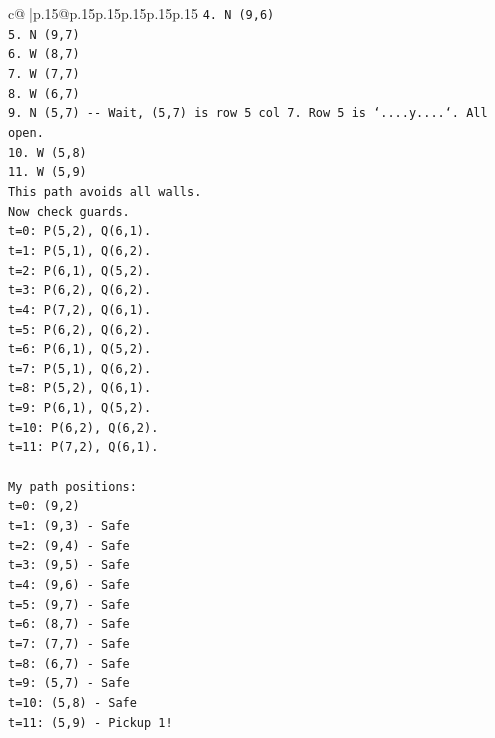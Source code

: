 \documentclass{article}
\begin{document}
{\begin{supertabular}{c@{$\;$}|p{.15\linewidth}@{}p{.15\linewidth}p{.15\linewidth}p{.15\linewidth}p{.15\linewidth}p{.15\linewidth}}
{{{\texttt{4. N (9,6)} \\
\texttt{5. N (9,7)} \\
\texttt{6. W (8,7)} \\
\texttt{7. W (7,7)} \\
\texttt{8. W (6,7)} \\
\texttt{9. N (5,7) {-}{-} Wait, (5,7) is row 5 col 7. Row 5 is `....y....`. All open.} \\
\texttt{10. W (5,8)} \\
\texttt{11. W (5,9)} \\
\texttt{This path avoids all walls.} \\
\texttt{Now check guards.} \\
\texttt{t=0: P(5,2), Q(6,1).} \\
\texttt{t=1: P(5,1), Q(6,2).} \\
\texttt{t=2: P(6,1), Q(5,2).} \\
\texttt{t=3: P(6,2), Q(6,2).} \\
\texttt{t=4: P(7,2), Q(6,1).} \\
\texttt{t=5: P(6,2), Q(6,2).} \\
\texttt{t=6: P(6,1), Q(5,2).} \\
\texttt{t=7: P(5,1), Q(6,2).} \\
\texttt{t=8: P(5,2), Q(6,1).} \\
\texttt{t=9: P(6,1), Q(5,2).} \\
\texttt{t=10: P(6,2), Q(6,2).} \\
\texttt{t=11: P(7,2), Q(6,1).} \\
\\ 
\texttt{My path positions:} \\
\texttt{t=0: (9,2)} \\
\texttt{t=1: (9,3) {-} Safe} \\
\texttt{t=2: (9,4) {-} Safe} \\
\texttt{t=3: (9,5) {-} Safe} \\
\texttt{t=4: (9,6) {-} Safe} \\
\texttt{t=5: (9,7) {-} Safe} \\
\texttt{t=6: (8,7) {-} Safe} \\
\texttt{t=7: (7,7) {-} Safe} \\
\texttt{t=8: (6,7) {-} Safe} \\
\texttt{t=9: (5,7) {-} Safe} \\
\texttt{t=10: (5,8) {-} Safe} \\
\texttt{t=11: (5,9) {-} Pickup 1!} \\
\\ 
}}}
\end{supertabular}}
\end{document}
